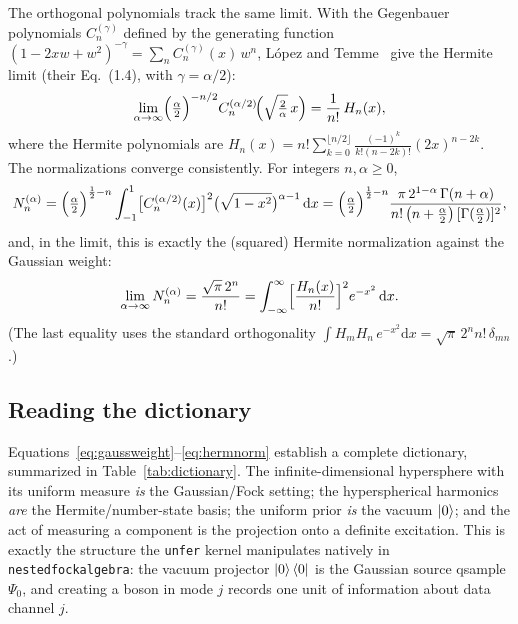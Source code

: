 \documentclass[11pt, a4paper]{article}
\begin{document}
The orthogonal polynomials track the same limit. With the Gegenbauer
polynomials $C_n^{(\gamma)}$ defined by the generating function
$(1-2xw+w^2)^{-\gamma}=\sum_n C_n^{(\gamma)}(x)\,w^n$, L\'opez and
Temme~\cite{LopezTemme1999} give the Hermite limit (their Eq.~(1.4), with
$\gamma=\alpha/2$):
\begin{equation}
  \lim_{\alpha\to\infty}\Bigl(\tfrac{\alpha}{2}\Bigr)^{-n/2}
  C_n^{(\alpha/2)}\!\Bigl(\sqrt{\tfrac{2}{\alpha}}\,x\Bigr)
  =\frac{1}{n!}\,H_n(x),
  \label{eq:gegtoherm}
\end{equation}
where the Hermite polynomials are
$H_n(x)=n!\sum_{k=0}^{\lfloor n/2\rfloor}\frac{(-1)^k}{k!(n-2k)!}(2x)^{n-2k}$.
The normalizations converge consistently. For integers $n,\alpha\ge0$,
\begin{equation}
  N^{(\alpha)}_n
  =\Bigl(\tfrac{\alpha}{2}\Bigr)^{\frac12-n}
  \int_{-1}^{1}\bigl[C_n^{(\alpha/2)}(x)\bigr]^2
  \bigl(\sqrt{1-x^2}\bigr)^{\alpha-1}\,\mathrm{d}x
  =\Bigl(\tfrac{\alpha}{2}\Bigr)^{\frac12-n}
  \frac{\pi\,2^{1-\alpha}\,\Gamma(n+\alpha)}
       {n!\,\bigl(n+\tfrac{\alpha}{2}\bigr)\,[\Gamma(\tfrac{\alpha}{2})]^2},
  \label{eq:gegnorm}
\end{equation}
and, in the limit, this is exactly the (squared) Hermite normalization against
the Gaussian weight:
\begin{equation}
  \lim_{\alpha\to\infty}N^{(\alpha)}_n
  =\frac{\sqrt{\pi}\,2^n}{n!}
  =\int_{-\infty}^{\infty}\Bigl[\frac{H_n(x)}{n!}\Bigr]^2 e^{-x^2}\,\mathrm{d}x .
  \label{eq:hermnorm}
\end{equation}
(The last equality uses the standard orthogonality
$\int H_m H_n\,e^{-x^2}\mathrm{d}x=\sqrt{\pi}\,2^n n!\,\delta_{mn}$.)

\subsection{Reading the dictionary}

Equations~\eqref{eq:gaussweight}--\eqref{eq:hermnorm} establish a complete
dictionary, summarized in Table~\ref{tab:dictionary}. The infinite-dimensional
hypersphere with its uniform measure \emph{is} the Gaussian/Fock setting; the
hyperspherical harmonics \emph{are} the Hermite/number-state basis; the
uniform prior \emph{is} the vacuum $\ket{0}$; and the act of measuring a
component is the projection onto a definite excitation. This is exactly the
structure the \texttt{unfer} kernel manipulates natively in
\texttt{nested\textunderscore fock\textunderscore algebra}: the vacuum
projector $\ket{0}\bra{0}$ is the Gaussian source qsample $\Psi_0$, and creating
a boson in mode $j$ records one unit of information about data channel $j$.
\end{document}
